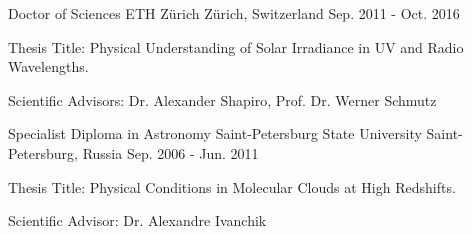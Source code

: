 

\begin{cventries}

  \cventry
    {Doctor of Sciences} %
    {ETH Z{\"u}rich} %
    {Z{\"u}rich, Switzerland} %
    {Sep. 2011 - Oct. 2016} %
    {
      \begin{cvitems} %
        \item {Thesis Title: Physical Understanding of Solar Irradiance in UV and Radio Wavelengths.}
        \item {Scientific Advisors: Dr. Alexander Shapiro, Prof. Dr. Werner Schmutz}
      \end{cvitems}
    }

  \cventry
    {Specialist Diploma in Astronomy} %
    {Saint-Petersburg State University} %
    {Saint-Petersburg, Russia} %
    {Sep. 2006 - Jun. 2011} %
    {
      \begin{cvitems} %
        \item {Thesis Title: Physical Conditions in Molecular Clouds at High Redshifts.}
        \item {Scientific Advisor: Dr. Alexandre Ivanchik}
      \end{cvitems}
    }

\end{cventries}
